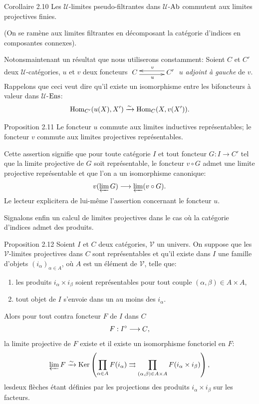 \documentclass[10pt]{../fichiers-configuration-latex/smfart}
\def\labelenumi{(\theenumi)}
\begin{document}
\begin{enonce*}{Corollaire 2.10}
Les $𝒰$-limites pseudo-filtrantes dans $𝒰$-$\operatorname{Ab}$
commutent aux limites projectives finies.
\end{enonce*}

(On se ramène aux limites filtrantes en décomposant la catégorie
d'indices en composantes connexes).

Notons\pageoriginale maintenant un résultat que nous utiliserons
constamment: Soient $C$ et $C'$ deux $𝒰$-catégories, $u$ et
$v$ deux foncteurs $\xymatrix@C=1.25cm{ C  \ar@<-.6ex>[r]_u & C'
\ar@<-.6ex>[l]_v }$ $u$ \emph{adjoint à gauche} de $v$. Rappelons
que ceci veut dire qu'il existe un isomorphisme entre les
bifoncteurs à valeur dans $𝒰$-$\operatorname{Ens}$:
$$
\operatorname{Hom}_{C'}(u(X),X')\xrightarrow{\sim}\operatorname{Hom}_{C}(X,v(X')){}.
$$

\begin{enonce*}{Proposition 2.11}
Le foncteur $u$ commute aux limites inductives représentables; le
foncteur $v$ commute aux limites projectives représentables.
\end{enonce*}

Cette assertion signifie que pour toute catégorie $I$ et tout
foncteur $G:I\rightarrow C'$ tel que la limite projective de $G$
soit représentable, le foncteur $v\circ G$ admet une limite
projective représentable et que l'on a un isomorphisme canonique:
$$
v(\varprojlim G)\longrightarrow \varprojlim(v\circ G){}.
$$
Le lecteur explicitera de lui-même l'assertion concernant le
foncteur $u$.

Signalons enfin un calcul de limites projectives dans le cas où la
catégorie d'indices admet des produits.

\begin{enonce*}{Proposition 2.12}
Soient $I$ et $C$ deux catégories, $𝒱$ un univers. On
suppose que les $𝒱$-limites projectives dans $C$ sont
représentables et qu'il existe dans $I$ une famille d'objets
$(i_\alpha)_{\alpha\in A}$, où $A$ est un élément de $𝒱$,
telle que:
\begin{enumerate}
\renewcommand{\labelenumi}{\theenumi)}
\item les produits $i_\alpha\times i_\beta$ soient représentables
  pour tout couple $(\alpha,\beta)\in A\times A$,

\item tout objet de $I$ s'envoie dans un au moins des $i_\alpha$.
\end{enumerate}


Alors pour tout contra foncteur $F$ de $I$ dans $C$
$$
F:I^\circ\longrightarrow C{},
$$
la limite projective de $F$ existe et il existe un isomorphisme
fonctoriel en $F$:
$$
\varprojlim F\xrightarrow{\sim} \operatorname{Ker} \left(\prod_{\alpha\in
  A} F(i_\alpha)\rightrightarrows \prod_{(\alpha,\beta)\in A\times A}
F(i_\alpha \times i_\beta)\right){},
$$
les\pageoriginale deux flèches étant définies par les projections
des produits $i_\alpha\times i_\beta$ sur les facteurs.
\end{enonce*}
\end{document}
